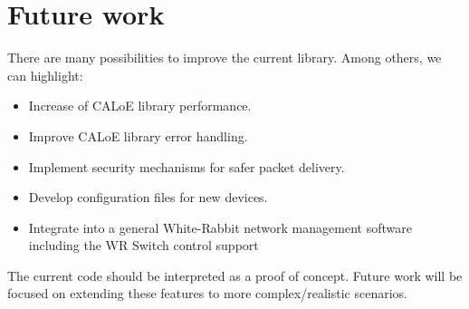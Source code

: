 \section{Future work}

There are many possibilities to improve the current library. Among others, we can highlight:

\begin{itemize}
 \item {Increase of CALoE library performance.}
 \item {Improve CALoE library error handling.}
 \item {Implement security mechanisms for safer packet delivery.}
 \item {Develop configuration files for new devices.}
 \item {Integrate into a general White-Rabbit network management software including the WR Switch control support}
\end{itemize}

The current code should be interpreted as a proof of concept. 
Future work will be focused on extending these features to more complex/realistic scenarios.  
